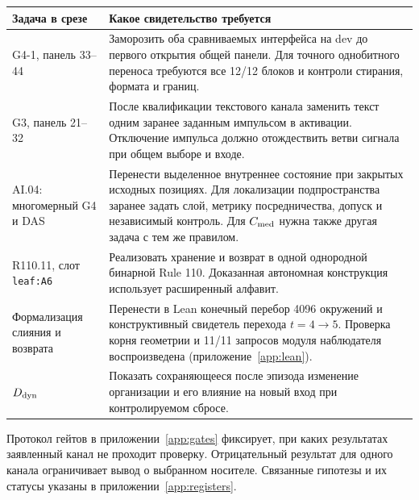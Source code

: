 \begin{center}\small
\begin{tabularx}{\linewidth}{@{}p{.23\linewidth}X@{}}\toprule
Задача в срезе & Какое свидетельство требуется \\\midrule
G4-1, панель 33--44 & Заморозить оба сравниваемых интерфейса на dev до первого открытия общей панели. Для точного однобитного переноса требуются все 12/12 блоков и контроли стирания, формата и границ.\\
G3, панель 21--32 & После квалификации текстового канала заменить текст одним заранее заданным импульсом в активации. Отключение импульса должно отождествить ветви сигнала при общем выборе и входе.\\
AI.04: многомерный G4 и DAS & Перенести выделенное внутреннее состояние при закрытых исходных позициях. Для локализации подпространства заранее задать слой, метрику посредничества, допуск и независимый контроль. Для $C_{\rm med}$ нужна также другая задача с тем же правилом.\\
R110.11, слот \texttt{leaf:A6} & Реализовать хранение и возврат в одной однородной бинарной Rule 110. Доказанная автономная конструкция использует расширенный алфавит.\\
Формализация слияния и возврата & Перенести в Lean конечный перебор 4096 окружений и конструктивный свидетель перехода $t=4\to5$. Проверка корня геометрии и 11/11 запросов модуля наблюдателя воспроизведена (приложение~\ref{app:lean}).\\
$D_{\rm dyn}$ & Показать сохраняющееся после эпизода изменение организации и его влияние на новый вход при контролируемом сбросе.\\
\bottomrule\end{tabularx}
\end{center}
Протокол гейтов в приложении~\ref{app:gates} фиксирует, при каких результатах заявленный канал не проходит проверку. Отрицательный результат для одного канала ограничивает вывод о выбранном носителе. Связанные гипотезы и их статусы указаны в приложении~\ref{app:registers}.
